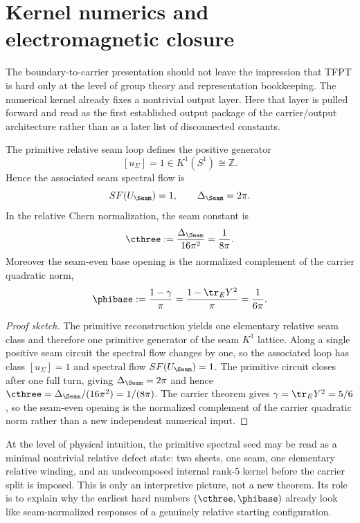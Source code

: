 
\section{Kernel numerics and electromagnetic closure}

The boundary-to-carrier presentation should not leave the impression that TFPT is hard only at the level of group theory and representation bookkeeping. The numerical kernel already fixes a nontrivial output layer. Here that layer is pulled forward and read as the first established output package of the carrier/output architecture rather than as a later list of disconnected constants.

\begin{theorem}
\label{thm:primitive-seam-generator}
The primitive relative seam loop defines the positive generator
\[
[u_\Sigma]=1\in K^1(S^1)\cong \mathbb Z.
\]
Hence the associated seam spectral flow is
\[
SF(U_\Seam)=1,
\qquad
\Delta_\Seam=2\pi.
\]
In the relative Chern normalization, the seam constant is
\[
\cthree:=\frac{\Delta_\Seam}{16\pi^2}=\frac{1}{8\pi}.
\]
Moreover the seam-even base opening is the normalized complement of the carrier quadratic norm,
\[
\phibase
:=
\frac{1-\gamma}{\pi}
=
\frac{1-\tr_EY^2}{\pi}
=
\frac{1}{6\pi}.
\]
\end{theorem}

\begin{proof}[Proof sketch]
The primitive reconstruction yields one elementary relative seam class and therefore one primitive
generator of the seam $K^1$ lattice. Along a single positive seam circuit the spectral flow changes
by one, so the associated loop has class $[u_\Sigma]=1$ and spectral flow $SF(U_\Seam)=1$. The
primitive circuit closes after one full turn, giving $\Delta_\Seam=2\pi$ and hence
$\cthree=\Delta_\Seam/(16\pi^2)=1/(8\pi)$. The carrier theorem gives
$\gamma=\tr_EY^2=5/6$, so the seam-even opening is the normalized complement of the carrier
quadratic norm rather than a new independent numerical input.
\end{proof}

\begin{remark}
At the level of physical intuition, the primitive spectral seed may be read as a minimal nontrivial relative defect state: two sheets, one seam, one elementary relative winding, and an undecomposed internal rank-$5$ kernel before the carrier split is imposed. This is only an interpretive picture, not a new theorem. Its role is to explain why the earliest hard numbers $(\cthree,\phibase)$ already look like seam-normalized responses of a genuinely relative starting configuration.
\end{remark}

